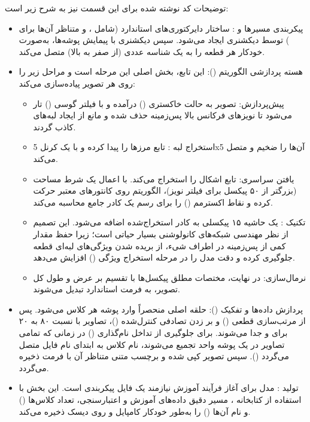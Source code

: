 \documentclass{article}
\begin{document}
توضیحات کد نوشته شده برای این قسمت نیز به شرح زیر است:

\begin{itemize}

	\item پیکربندی مسیرها و : ساختار دایرکتوری‌های استاندارد  (شامل ،  و متناظر آن‌ها برای ) توسط دیکشنری  ایجاد می‌شود. سپس دیکشنری  با پیمایش پوشه‌ها، به‌صورت خودکار هر قطعه را به یک شناسه عددی (از صفر به بالا) متصل می‌کند.
	\item هسته پردازشی الگوریتم (): این تابع، بخش اصلی این مرحله است و مراحل زیر را روی هر تصویر پیاده‌سازی می‌کند:
	\begin{itemize}
		\item پیش‌پردازش: تصویر به حالت خاکستری () درآمده و با فیلتر گوسی () تار می‌شود تا نویزهای فرکانس بالا پس‌زمینه حذف شده و مانع از ایجاد لبه‌های کاذب گردند.
		\item استخراج لبه : تابع  مرزها را پیدا کرده و  با یک کرنل 5x5 آن‌ها را ضخیم و متصل می‌کند.
		\item یافتن  سراسری: تابع  اشکال را استخراج می‌کند. با اعمال یک شرط مساحت (بزرگتر از ۵۰ پیکسل برای فیلتر نویز)، الگوریتم روی کانتورهای معتبر حرکت کرده و نقاط اکسترمم () را برای رسم یک کادر جامع محاسبه می‌کند.
		\item تکنیک  : یک حاشیه ۱۵ پیکسلی به کادر استخراج‌شده اضافه می‌شود. این تصمیم از نظر مهندسی شبکه‌های کانولوشنی بسیار حیاتی است؛ زیرا حفظ مقدار کمی از پس‌زمینه در اطراف شیء، از بریده شدن ویژگی‌های لبه‌ای قطعه جلوگیری کرده و دقت مدل را در مرحله استخراج ویژگی () افزایش می‌دهد.
		\item نرمال‌سازی: در نهایت، مختصات مطلق پیکسل‌ها با تقسیم بر عرض و طول کل تصویر، به فرمت استاندارد  تبدیل می‌شوند.
	\end{itemize}
	\item پردازش داده‌ها و تفکیک (): حلقه اصلی منحصراً وارد پوشه  هر کلاس می‌شود. پس از مرتب‌سازی قطعی () و بر زدن تصادفی کنترل‌شده ()، تصاویر با نسبت ۸۰ به ۲۰ برای  و  جدا می‌شوند. برای جلوگیری از تداخل نام‌گذاری () در زمانی که تمامی تصاویر در یک پوشه واحد تجمیع می‌شوند، نام کلاس به ابتدای نام فایل متصل می‌گردد (). سپس تصویر کپی شده و برچسب متنی متناظر آن با فرمت  ذخیره می‌گردد.
	\item تولید : مدل  برای آغاز فرآیند آموزش نیازمند یک فایل پیکربندی است. این بخش با استفاده از کتابخانه ، مسیر دقیق داده‌های آموزش و اعتبارسنجی، تعداد کلاس‌ها () و نام آن‌ها () را به‌طور خودکار کامپایل و روی دیسک ذخیره می‌کند.
\end{itemize}
\end{document}
